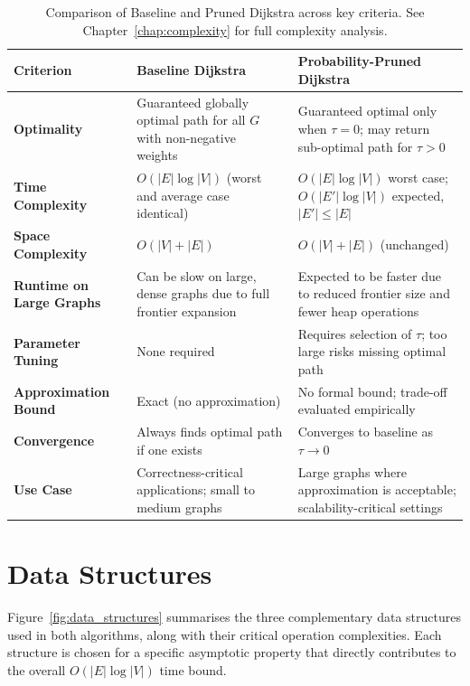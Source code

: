 \begin{table}[h!]
\centering
\renewcommand{\arraystretch}{1.3}
\begin{tabular}{@{}p{2.8cm}p{5.5cm}p{5.5cm}@{}}
\toprule
\textbf{Criterion} & \textbf{Baseline Dijkstra} & \textbf{Probability-Pruned Dijkstra} \\
\midrule
\textbf{Optimality} & Guaranteed globally optimal path for all $G$ with non-negative weights~\citep{dijkstra1959} & Guaranteed optimal only when $\tau = 0$; may return sub-optimal path for $\tau > 0$ \\[4pt]
\textbf{Time Complexity} & $O(|E|\log|V|)$ (worst and average case identical)~\citep{cormen2009} & $O(|E|\log|V|)$ worst case; $O(|E'|\log|V|)$ expected, $|E'| \leq |E|$ \\[4pt]
\textbf{Space Complexity} & $O(|V|+|E|)$ & $O(|V|+|E|)$ (unchanged) \\[4pt]
\textbf{Runtime on Large Graphs} & Can be slow on large, dense graphs due to full frontier expansion & Expected to be faster due to reduced frontier size and fewer heap operations \\[4pt]
\textbf{Parameter Tuning} & None required & Requires selection of $\tau$; too large risks missing optimal path \\[4pt]
\textbf{Approximation Bound} & Exact (no approximation) & No formal bound; trade-off evaluated empirically \\[4pt]
\textbf{Convergence} & Always finds optimal path if one exists & Converges to baseline as $\tau \to 0$~\citep{cormen2009} \\[4pt]
\textbf{Use Case} & Correctness-critical applications; small to medium graphs & Large graphs where approximation is acceptable; scalability-critical settings \\
\bottomrule
\end{tabular}
\caption[Algorithm comparison]{Comparison of Baseline and Pruned Dijkstra across key criteria. See Chapter~\ref{chap:complexity} for full complexity analysis.}
\label{table:algo_compare}
\end{table}

\section{Data Structures}

Figure~\ref{fig:data_structures} summarises the three complementary data structures used in both algorithms, along with their critical operation complexities. Each structure is chosen for a specific asymptotic property that directly contributes to the overall $O(|E|\log|V|)$ time bound.


